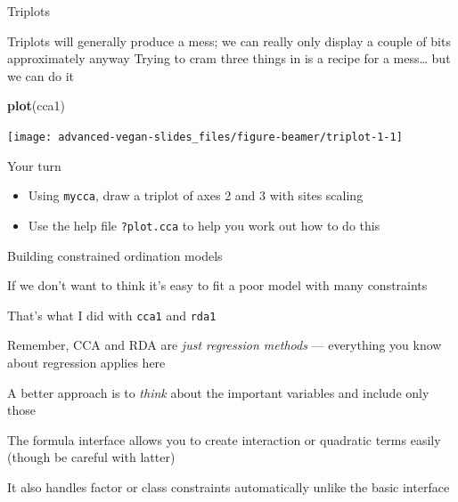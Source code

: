 \documentclass[10pt,ignorenonframetext,compress, aspectratio=169]{beamer}
\newenvironment{Shaded}{\begin{snugshade}}{\end{snugshade}}
\newcommand{\KeywordTok}[1]{\textcolor[rgb]{0.13,0.29,0.53}{\textbf{{#1}}}}
\newcommand{\NormalTok}[1]{{#1}}
\providecommand{\tightlist}{%
  \setlength{\itemsep}{0pt}\setlength{\parskip}{0pt}}
\begin{document}
\begin{frame}[fragile]{Triplots}

Triplots will generally produce a mess; we can really only display a
couple of bits approximately anyway Trying to cram three things in is a
recipe for a mess\ldots{} but we can do it

\scriptsize

\begin{Shaded}
\begin{Highlighting}[]
\KeywordTok{plot}\NormalTok{(cca1)}
\end{Highlighting}
\end{Shaded}

\begin{center}\texttt{[image: advanced-vegan-slides\_files/figure-beamer/triplot-1-1]} \end{center}

\normalsize

\end{frame}

\begin{frame}[fragile]{Your turn}

\begin{itemize}
\tightlist
\item
  Using \texttt{mycca}, draw a triplot of axes 2 and 3 with sites
  scaling
\item
  Use the help file \texttt{?plot.cca} to help you work out how to do
  this
\end{itemize}

\end{frame}

\begin{frame}[fragile]{Building constrained ordination models}

If we don't want to think it's easy to fit a poor model with many
constraints

That's what I did with \texttt{cca1} and \texttt{rda1}

Remember, CCA and RDA are \emph{just regression methods} --- everything
you know about regression applies here

A better approach is to \emph{think} about the important variables and
include only those

The formula interface allows you to create interaction or quadratic
terms easily (though be careful with latter)

It also handles factor or class constraints automatically unlike the
basic interface

\end{frame}
\end{document}
